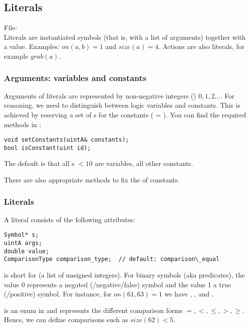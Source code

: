 \documentclass[10pt,twoside,twocolumn,fleqn]{article}
\begin{document}
\subsection{Literals}

File: \\


Literals are instantiated symbols (that is, with a list of arguments)
together with a value. Examples: $on(a,b)=1$ and $size(a)=4$. Actions
are also literals, for example $grab(a)$.


\subsubsection{Arguments: variables and constants}
\label{sec:literals:arguments}

Arguments of literals are represented by non-negative integers
() $0,1,2 \dots$. For reasoning, we need to distinguish between
logic variables and constants. This is achieved by reserving a set of
s for the constants ( = ).
You can find the required methods in :
\begin{lstlisting}
void setConstants(uintA& constants);
bool isConstant(uint id);
\end{lstlisting}
The default is that all s $<10$ are variables, all other
constants.

There are also appropriate methods to fix the  of
constants.


\subsubsection{Literals}

A literal consists of the following attributes:
\begin{lstlisting}
Symbol* s;
uintA args;
double value;
ComparisonType comparison_type;  // default: comparison\_equal
\end{lstlisting}
 is short for  (a list of unsigned
integers). For binary symbols (aka predicates), the value 0 represents a
negated (/negative/false) symbol and the value 1 a true (/positive) symbol.
For instance, for $on(61,63)=1$ we have ,
,  and .

 is an enum in  and represents
the different comparison forms $=, <, \le, >, \ge$. Hence, we can define
comparisons such as $size(62)<5$.
\end{document}
